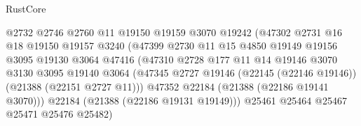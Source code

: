 \begin{lexlean}{RustCore}
\begin{coremodule}
                                      @2732
                                      @2746
                                      @2760
                                      @11
                                      @19150
                                      @19159
                                      @3070
                                      @19242
                                      (@47302
                                        @2731
                                        @16
                                        @18
                                        @19150
                                        @19157
                                        @3240
                                        (@47399
                                          @2730
                                          @11
                                          @15
                                          @4850
                                          @19149
                                          @19156
                                          @3095
                                          @19130
                                          @3064
                                          @47416
                                          (@47310
                                            @2728
                                            @177
                                            @11
                                            @14
                                            @19146
                                            @3070
                                            @3130
                                            @3095
                                            @19140
                                            @3064
                                            (@47345
                                              @2727
                                              @19146
                                              (@22145 (@22146 @19146))
                                              (@21388 (@22151 @2727 @11)))
                                            @47352
                                            @22184
                                            (@21388 (@22186 @19141 @3070)))
                                          @22184
                                          (@21388 (@22186 @19131 @19149)))
                                        @25461
                                        @25464
                                        @25467
                                        @25471
                                        @25476
                                        @25482)

\end{coremodule}
\end{lexlean}

